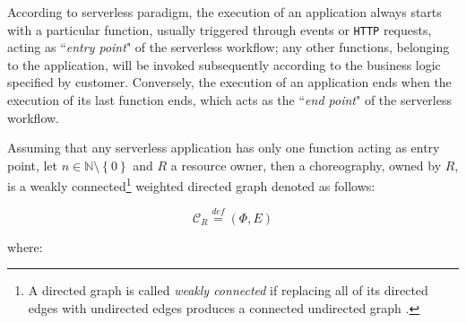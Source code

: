 \documentclass[12pt,a4paper]{report}
\newcommand{\mathDef}{\overset{\textit{def}}{=}}
\newcommand{\N}{\mathbb{N}}
\newcommand{\SetMinusZero}{\setminus \left\{0\right\}}
\begin{document}
According to serverless paradigm, the execution of an application always starts with a particular function, usually triggered through events or \texttt{HTTP} requests, acting as ``\textit{entry point}" of the serverless workflow; any other functions, belonging to the application, will be invoked subsequently according to the business logic specified by customer. Conversely, the execution of an application ends when the execution of its last function ends, which acts as the ``\textit{end point}" of the serverless workflow. 

Assuming that any serverless application has only one function acting as entry point, let $n \in \N \SetMinusZero$ and $R$ a resource owner, then a choreography, owned by $R$, is a weakly connected\footnote{A directed graph is called \textit{weakly connected} if replacing all of its directed edges with undirected edges produces a connected undirected graph \cite{GraphTheory}.} weighted directed graph denoted as follows:

\begin{equation}
	\mathcal{C}_R \mathDef (\Phi,E)
\end{equation}

where:
\end{document}
